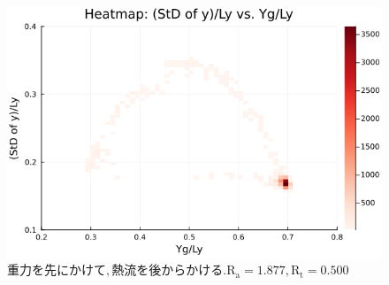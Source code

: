 \begin{figure}[H]
  \centering
  \includegraphics[scale=0.6]{image/RaRtmap_drop_heat/2023-12-21T10:44:58.955_RaRtmap_chi1.265_Ay50_rho0.4_T0.43_dT0.04_Rd0.0_Rt0.5_Ra1.877538_g0.0003999718779659611_run4.0e7.png}
  \caption{$重力を先にかけて, 熱流を後からかける. \text{R}_\text{a}=1.877,\text{R}_\text{t}=0.500$}
  \label{}
\end{figure} 

